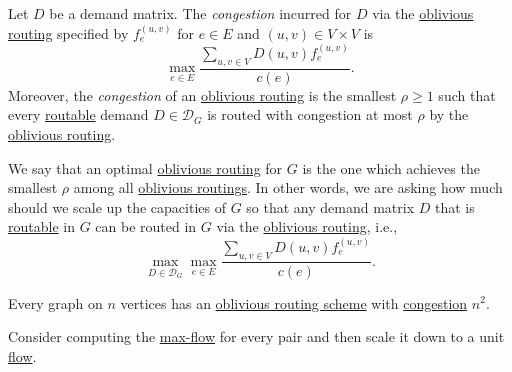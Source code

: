 \begin{definition}\label{def:congestion-of-oblivious-routing}
	Let \(D\) be a demand matrix. The \emph{congestion} incurred for \(D\) via the \hyperref[def:oblivious-routing-scheme]{oblivious routing} specified by \(f_e^{(u, v)}\) for \(e \in E\) and \((u, v) \in V \times V\) is
	\[
		\max _{e \in E} \frac{\sum_{u, v \in V} D(u, v) f_e^{(u, v)}}{c(e)}.
	\]
	Moreover, the \emph{congestion} of an \hyperref[def:oblivious-routing-scheme]{oblivious routing} is the smallest \(\rho \geq 1\) such that every \hyperref[def:routable]{routable} demand \(D \in \mathcal{D} _G\) is routed with congestion at most \(\rho \) by the \hyperref[def:oblivious-routing-scheme]{oblivious routing}.
\end{definition}

We say that an optimal \hyperref[def:oblivious-routing-scheme]{oblivious routing} for \(G\) is the one which achieves the smallest \(\rho \) among all \hyperref[def:oblivious-routing-scheme]{oblivious routings}. In other words, we are asking how much should we scale up the capacities of \(G\) so that any demand matrix \(D\) that is \hyperref[def:routable]{routable} in \(G\) can be routed in \(G\) via the \hyperref[def:oblivious-routing-scheme]{oblivious routing}, i.e.,
\[
	\max _{D \in \mathcal{D} _G} \max _{e \in E} \frac{\sum_{u, v \in V} D(u, v) f_e^{(u, v)}}{c(e)}.
\]

\begin{claim}
	Every graph on \(n\) vertices has an \hyperref[prb:oblivious-routing]{oblivious routing scheme} with \hyperref[def:congestion-of-oblivious-routing]{congestion} \(n^2\).
\end{claim}
\begin{explanation}
	Consider computing the \hyperref[prb:s-t-max-flow]{max-flow} for every pair and then scale it down to a unit \hyperref[def:flow]{flow}.
\end{explanation}

